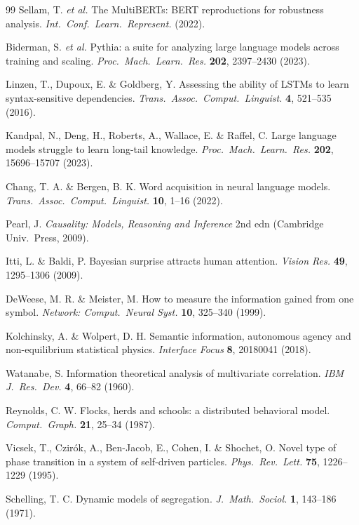 \documentclass[11pt]{article}
\theoremstyle{definition}
\begin{document}
\begin{thebibliography}{99}
 Sellam, T. \emph{et al.} The MultiBERTs: BERT
reproductions for robustness analysis. \emph{Int.\ Conf.\ Learn.\
Represent.} (2022).

 Biderman, S. \emph{et al.} Pythia: a suite for
analyzing large language models across training and scaling.
\emph{Proc.\ Mach.\ Learn.\ Res.} \textbf{202}, 2397--2430 (2023).

 Linzen, T., Dupoux, E. \& Goldberg, Y. Assessing
the ability of LSTMs to learn syntax-sensitive dependencies.
\emph{Trans.\ Assoc.\ Comput.\ Linguist.} \textbf{4}, 521--535
(2016).

 Kandpal, N., Deng, H., Roberts, A., Wallace, E.
\& Raffel, C. Large language models struggle to learn long-tail
knowledge. \emph{Proc.\ Mach.\ Learn.\ Res.} \textbf{202},
15696--15707 (2023).

 Chang, T. A. \& Bergen, B. K. Word
acquisition in neural language models. \emph{Trans.\ Assoc.\ Comput.\
Linguist.} \textbf{10}, 1--16 (2022).

 Pearl, J. \emph{Causality: Models, Reasoning and
Inference} 2nd edn (Cambridge Univ.\ Press, 2009).

 Itti, L. \& Baldi, P. Bayesian surprise
attracts human attention. \emph{Vision Res.} \textbf{49}, 1295--1306
(2009).

 DeWeese, M. R. \& Meister, M. How to measure the
information gained from one symbol. \emph{Network: Comput.\ Neural
Syst.} \textbf{10}, 325--340 (1999).

 Kolchinsky, A. \& Wolpert, D. H. Semantic
information, autonomous agency and non-equilibrium statistical physics.
\emph{Interface Focus} \textbf{8}, 20180041 (2018).

 Watanabe, S. Information theoretical analysis
of multivariate correlation. \emph{IBM J.\ Res.\ Dev.} \textbf{4},
66--82 (1960).

 Reynolds, C. W. Flocks, herds and schools: a
distributed behavioral model. \emph{Comput.\ Graph.} \textbf{21},
25--34 (1987).

 Vicsek, T., Czir\'ok, A., Ben-Jacob, E., Cohen,
I. \& Shochet, O. Novel type of phase transition in a system of
self-driven particles. \emph{Phys.\ Rev.\ Lett.} \textbf{75},
1226--1229 (1995).

 Schelling, T. C. Dynamic models of
segregation. \emph{J.\ Math.\ Sociol.} \textbf{1}, 143--186 (1971).


\end{thebibliography}
\end{document}
